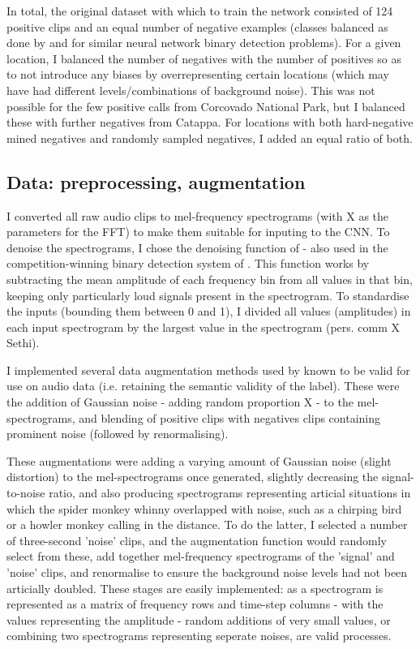 \documentclass[11pt]{article}
\begin{document}
In total, the original dataset with which to train the network consisted of 124 positive clips and an equal number of negative examples (classes balanced as done by \cite{mac2018bat} and \citep{kiskin2017mosquito} for similar neural network binary detection problems). For a given location, I balanced the number of negatives with the number of positives so as to not introduce any biases by overrepresenting certain locations (which may have had different levels/combinations of background noise). This was not possible for the few positive calls from Corcovado National Park, but I balanced these with further negatives from Catappa. For locations with both hard-negative mined negatives and randomly sampled negatives, I added an equal ratio of both.   

\subsection{Data: preprocessing, augmentation}

I converted all raw audio clips to mel-frequency spectrograms (with X as the parameters for the FFT) to make them suitable for inputing to the CNN. To denoise the spectrograms, I chose the denoising function of \cite{aide2013real} - also used in the competition-winning binary detection system of \cite{kahl2017large}. This function works by subtracting the mean amplitude of each frequency bin from all values in that bin, keeping only particularly loud signals present in the spectrogram. To standardise the inputs (bounding them between 0 and 1), I divided all values (amplitudes) in each input spectrogram by the largest value in the spectrogram (pers. comm  X Sethi).

I implemented several data augmentation methods used by \cite{kahl2017large} known to be valid for use on audio data (i.e. retaining the semantic validity of the label). These were the addition of Gaussian noise - adding random proportion X - to the mel-spectrograms, and blending of positive clips with negatives clips containing prominent noise (followed by renormalising). 

These augmentations were adding a varying amount of Gaussian noise (slight distortion) to the mel-spectrograms once generated, slightly decreasing the signal-to-noise ratio, and also producing spectrograms representing articial situations in which the spider monkey whinny overlapped with noise, such as a chirping bird or a howler monkey calling in the distance. To do the latter, I selected a number of three-second 'noise' clips, and the augmentation function would randomly select from these, add together mel-frequency spectrograms of the 'signal' and 'noise' clips, and renormalise to ensure the background noise levels had not been articially doubled. These stages are easily implemented: as a spectrogram is represented as a matrix of frequency rows and time-step columns - with the values representing the amplitude - random additions of very small values, or combining two spectrograms representing seperate noises, are valid processes.   
\end{document}

